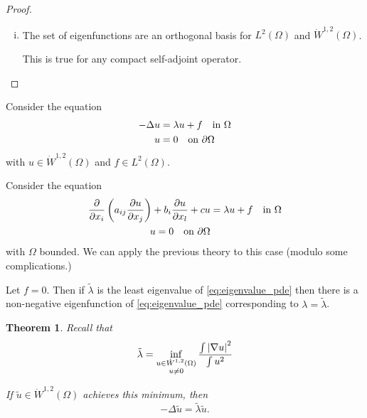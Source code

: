 \documentclass[10pt, oneside, reqno]{amsart}
\theoremstyle{plain}%
\newtheorem{thm}{Theorem}[section]
\numberwithin{equation}{section}
\theoremstyle{definition}
\theoremstyle{remark}
\renewcommand{\ker}{\textsc{Ker\ }}
\newcommand{\iprod}[1]{\left\langle #1 \right\rangle}
\begin{document}
\begin{proof}{\ }
\begin{enumerate}[(i)]
    Recall from Theorem \ref{thm:rangeclosed}, $Tx = y$ has a solution if and only if $f(y) = 0$ for all $f \in \ker T'$.  Note that the this is satisfied if and only if $\iprod{F, \phi_n} = (f, \phi_l) = 0$ for all eigenfunctions $\phi_n$.
    \item The set of eigenfunctions are an orthogonal basis for $L^2(\Omega)$ and $\dot W^{1, 2}(\Omega)$.
    
    This is true for any compact self-adjoint operator.
    
    \qedhere
\end{enumerate}
\end{proof}


Consider the equation \begin{align}
    \label{eq:eigenvalue_pde}
    -\Delta u &= \lambda u + f \quad \text{in $\Omega$} \\
    u &= 0 \quad \text{on $\partial \Omega$} \notag \\
\end{align} with $u \in \dot W^{1, 2}(\Omega)$ and $f \in L^2(\Omega)$.

Consider the equation \begin{align*}
    \frac{\partial }{\partial x_i} \left(a_{ij} \frac{\partial u}{\partial x_j} \right) + b_i \frac{\partial u}{\partial x_l} + cu &= \lambda u  + f \quad \text{in $\Omega$} \\
    u = 0 \quad \text{on $\partial \Omega$}
\end{align*} with $\Omega$ bounded.  We can apply the previous theory to this case (modulo some complications.)

Let $f = 0$.  Then if $\tilde \lambda$ is the least eigenvalue of \eqref{eq:eigenvalue_pde} then there is a non-negative eigenfunction of \eqref{eq:eigenvalue_pde} corresponding to $\lambda = \tilde \lambda$.

\begin{thm}
    \label{lem:minimal_eigenvalues}
    Recall that \begin{equation}
        \tilde \lambda = \inf_{\substack{u \in \dot W^{1,2}(\Omega) \\ u \neq 0}} \frac{\int \left| \nabla u \right|^2}{\int u^2} 
        \label{eq:minimal_eigenvalue}
    \end{equation}
    
    
    If $\tilde u \in \dot W^{1, 2}(\Omega)$ achieves this minimum, then \[
        -\Delta \tilde u = \tilde \lambda \tilde u.
    \]
\end{thm}
\end{document}
